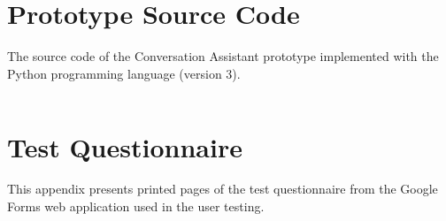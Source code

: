 \documentclass[english, 12pt, a4paper, pdftex, elec, utf8]{aaltothesis}
\begin{document}
\clearpage




\clearpage

\appendix

\section{Prototype Source Code} \label{sec:proto}

The source code of the Conversation Assistant prototype implemented with the Python programming language (version 3).

\inputminted[fontsize=\scriptsize]{python}{keskusteluavustin.py} %

\clearpage

\section{Test Questionnaire} \label{sec:kysely}

This appendix presents printed pages of the test questionnaire from the Google Forms web application used in the user testing.
\end{document}
